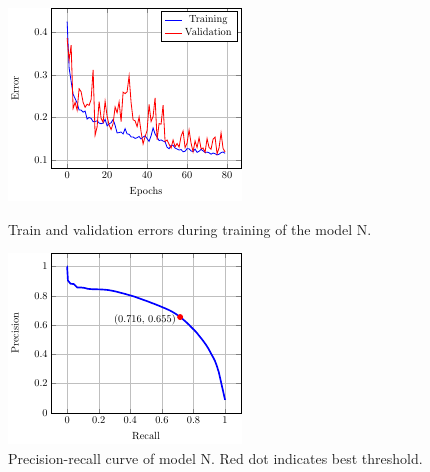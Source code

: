 \documentclass[10pt,conference]{IEEEtran}
\begin{document}
\begin{figure}
\centering
    \begin{minipage}[b]{.45\columnwidth}
        \includegraphics[width=\columnwidth]{report/images/plots/train_val_errors.pdf}
        \caption{Train and validation errors during training of the model N.}
        \label{fig:train_validation_errors}
    \end{minipage}\quad
    \begin{minipage}[b]{.45\columnwidth}
        \includegraphics[width=\columnwidth]{report/images/plots/prec_rec.pdf}
        \caption{Precision-recall curve of model N. Red dot indicates best threshold.}
        \label{fig:precision_recall}
    \end{minipage}
\end{figure}
\end{document}
